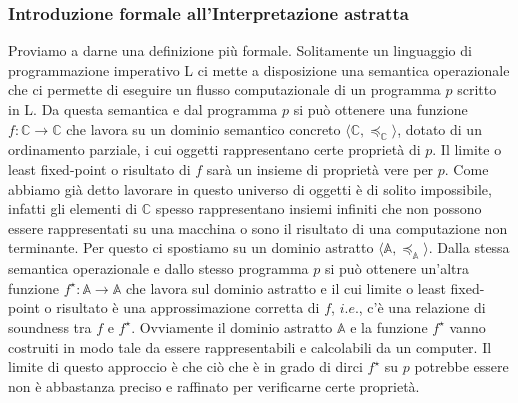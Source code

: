 \documentclass{article}
\theoremstyle{definition}
\theoremstyle{definition}
\begin{document}
\subsubsection{Introduzione formale all'Interpretazione astratta}
Proviamo a darne una definizione più formale. Solitamente un linguaggio di programmazione imperativo L ci mette a disposizione una semantica operazionale che ci permette di eseguire un flusso computazionale di un programma \(p\) scritto in L. Da questa semantica e dal programma \(p\) si può ottenere una funzione \(f:\mathbb{C}\rightarrow\mathbb{C}\) che lavora su un dominio semantico concreto \(\langle\mathbb{C}, \preceq_{\mathbb{C}}\rangle\), dotato di un ordinamento parziale, i cui oggetti rappresentano certe proprietà di \(p\). Il limite o least fixed-point o risultato di \(f\) sarà un insieme di proprietà vere per \(p\). Come abbiamo già detto lavorare in questo universo di oggetti è di solito impossibile, infatti gli elementi di \(\mathbb{C}\) spesso rappresentano insiemi infiniti che non possono essere rappresentati su una macchina o sono il risultato di una computazione non terminante. Per questo ci spostiamo su un dominio astratto \(\langle\mathbb{A}, \preceq_{\mathbb{A}}\rangle\). Dalla stessa semantica operazionale e dallo stesso programma \(p\) si può ottenere un'altra funzione \(f^{\star}:\mathbb{A}\rightarrow\mathbb{A}\) che lavora sul dominio astratto e il cui limite o least fixed-point o risultato è una approssimazione corretta di \(f\), \(i.e.\), c'è una relazione di soundness tra \(f\) e \(f^{\star}\). Ovviamente il dominio astratto \(\mathbb{A}\) e la funzione \(f^{\star}\) vanno costruiti in modo tale da essere rappresentabili e calcolabili da un computer. Il limite di questo approccio è che ciò che è in grado di dirci \(f^{\star}\) su \(p\) potrebbe essere non è abbastanza preciso e raffinato per verificarne certe proprietà.
\end{document}
